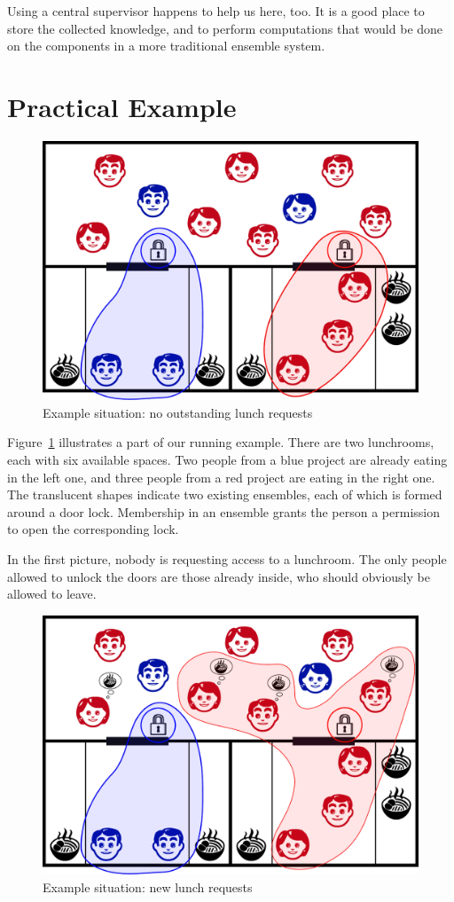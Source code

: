 Using a central supervisor happens to help us here, too. It is a good place to store
the collected knowledge, and to perform computations that would be done on the
components in a more traditional ensemble system.

\section{Practical Example}

\begin{figure}[ht]
    \centering
    \includegraphics[width=0.68\linewidth]{img/ensemble-norequest.pdf}
    \caption{Example situation: no outstanding lunch requests}
    \label{fig:norequests}
\end{figure}

Figure~\ref{fig:norequests} illustrates a part of our running example. There are two
lunchrooms, each with six available spaces. Two people from a blue project are already
eating in the left one, and three people from a red project are eating in the right one.
The translucent shapes indicate two existing ensembles, each of which is formed around a
door lock. Membership in an ensemble grants the person a permission to open the
corresponding lock.

In the first picture, nobody is requesting access to a lunchroom. The only people
allowed to unlock the doors are those already inside, who should obviously be allowed to
leave.

\begin{figure}[h]
    \centering
    \includegraphics[width=0.68\linewidth]{img/ensemble-withrequest.pdf}
    \caption{Example situation: new lunch requests}
    \label{fig:withrequests}
\end{figure}

